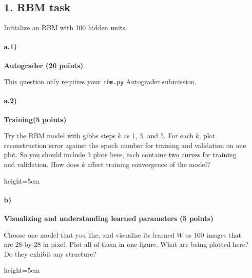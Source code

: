 \clearpage
\subsection*{1. RBM task}
Initialize an RBM with 100 hidden units. 

\paragraph{a.1)} \textbf{Autograder (20 points)}

This question only requires your \texttt{rbm.py} Autograder submission.

\paragraph{a.2)} \textbf{Training(5 points)}

Try the RBM model with gibbs steps $k$ as 1, 3, and 5. For each $k$, plot reconstruction error against the epoch number for training and validation on one plot. So you should include 3 plots here, each contains two curves for training and validation. How does $k$ affect training convergence of the model?

\begin{soln}{height=5cm}
\end{soln}

\paragraph{b)} \textbf{Visualizing and understanding learned parameters (5 points)}

Choose one model that you like, and visualize its learned $W$ as 100 images that are 28-by-28 in pixel. Plot all of them in one figure. What are being plotted here? Do they exhibit any structure?

\begin{soln}{height=5cm}
\end{soln}



